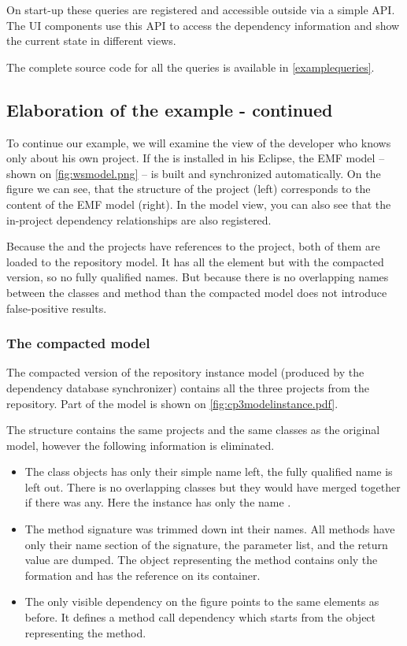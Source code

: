 On start-up these queries are registered and accessible outside via a simple API.
The UI components use this API to access the dependency information and show the
current state in different views.

The complete source code for all the queries is available in \autoref{examplequeries}.


\subsection{Elaboration of the example - continued}\label{sect:elabex2}
To continue our example, we will examine the view of the developer who knows
only about his own  project. If the \ptool{} is  installed in his
Eclipse, the EMF model -- shown on \autoref{fig:wsmodel.png}
-- is built and synchronized automatically. On the figure we can see, that the
structure of the project (left) corresponds to the content of the EMF model
(right). In the model view, you can also see that the in-project dependency
relationships are also registered.

Because the  and the  projects have references to the
 project, both of them are loaded to the repository model. It has all the
element but with the compacted version, so no fully qualified names. But because
there is no overlapping names between the classes and method than the compacted
model does not introduce false-positive results.


\subsubsection{The compacted model}
The compacted version of the repository instance model (produced by the
dependency database synchronizer) contains all the three projects from the
repository. Part of the model is shown on
\autoref{fig:cp3modelinstance.pdf}. 

The structure contains the same projects and the same
classes as the original model, however the following information is eliminated.
\begin{itemize}
  \item The class objects has only their simple name left, the fully qualified name is left out.
There is no overlapping classes but they would have merged together if
there was any. Here the  instance has only the name .
  \item The method signature was trimmed down int their names. All methods have only their 
name section of the signature, the parameter list, and the return value are dumped.    
The object representing the  method contains only the 
formation and has the reference on its container. 
  \item The only visible dependency on the figure points to the same elements as before.
  It defines a method call dependency which starts from the object representing the  method.
\end{itemize}


